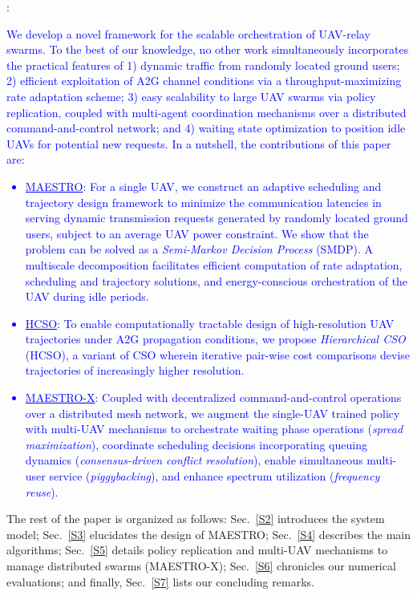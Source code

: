 \documentclass[12pt, draftcls, onecolumn]{IEEEtran}
\theoremstyle{plain}
\theoremstyle{definition}
\theoremstyle{remark}
\newcommand\hlt[1]{\textcolor{blue}{#1}}
\begin{document}
\label{contrib_subs}
\noindent{\hlt{\textbf{Contributions}}}: \hlt{We develop a novel framework for the scalable orchestration of UAV-relay swarms. To the best of our knowledge, no other work simultaneously incorporates the practical features of 1) dynamic traffic from randomly located ground users; 2) efficient exploitation of A2G channel conditions via a throughput-maximizing rate adaptation scheme; 3) easy scalability to large UAV swarms via policy replication, coupled with multi-agent coordination mechanisms over a distributed command-and-control network; and 4) waiting state optimization to position idle UAVs for potential new requests. In a nutshell, the contributions of this paper are:
\begin{itemize}[leftmargin=*]
    \item \underline{MAESTRO}: For a single UAV, we construct an adaptive scheduling and trajectory design framework to minimize the communication latencies in serving dynamic transmission requests generated by randomly located ground users, subject to an average UAV power constraint. We show that the problem can be solved as a \emph{Semi-Markov Decision Process} (SMDP). A multiscale decomposition facilitates efficient computation of rate adaptation, scheduling and trajectory solutions, and energy-conscious orchestration of the UAV during idle periods.
    \item \underline{HCSO}: To enable computationally tractable design of high-resolution UAV trajectories under A2G propagation conditions, we propose \emph{Hierarchical CSO} (HCSO), a variant of CSO wherein iterative pair-wise cost comparisons devise trajectories of increasingly higher resolution.
    \item \underline{MAESTRO-X}: Coupled with decentralized command-and-control operations over a distributed mesh network, we augment the single-UAV trained policy with multi-UAV mechanisms to orchestrate waiting phase operations (\emph{spread maximization}), coordinate scheduling decisions incorporating queuing dynamics (\emph{consensus-driven conflict resolution}), enable simultaneous multi-user service (\emph{piggybacking}), and enhance spectrum utilization (\emph{frequency reuse}).
\end{itemize}}

The rest of the paper is organized as follows: Sec.~\ref{S2} introduces the system model; Sec.~\ref{S3} elucidates the design of MAESTRO; Sec.~\ref{S4} describes the main algorithms; Sec.~\ref{S5} details policy replication and multi-UAV mechanisms to manage distributed swarms (MAESTRO-X); Sec.~\ref{S6} chronicles our numerical evaluations; and finally, Sec.~\ref{S7} lists our concluding remarks.
\vspace{-4mm}
\end{document}
